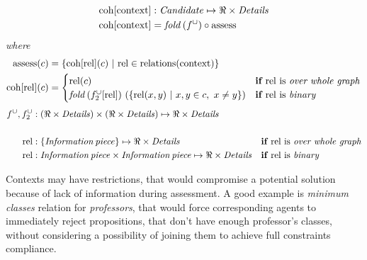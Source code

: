 \documentclass[ThesisDoc]{subfiles}
\begin{document}
\begin{align}
\begin{split}
  \mathrm{coh}[\mathrm{context}] &: \mathit{Candidate} \mapsto \Re \times \mathit{Details} \\
  \mathrm{coh}[\mathrm{context}] &= \mathit{fold}\,(f^\cup) \circ \mathrm{assess}
\end{split}
\end{align}
\emph{where}
\begin{align*}
    \mathrm{assess}(c) &=
      \lbrace \mathrm{coh}[\mathrm{rel}](c) ~|~ \mathrm{rel} \in \mathrm{relations}(\mathrm{context})
      \rbrace\\
    \mathrm{coh}[\mathrm{rel}](c) &= \begin{cases}
                       \mathrm{rel}(c) & \textbf{if } \mathrm{rel} \text{ is \emph{over whole graph}}
                       \\
                       \mathit{fold}\, (f^\cup_2[\mathrm{rel}]) ~
                                (\lbrace \mathrm{rel}(x,y) ~|~ x,y \in c, ~ x \not= y
                                 \rbrace)
                          & \textbf{if } \mathrm{rel} \text{ is \emph{binary}}
                     \end{cases}
\end{align*}
\begin{align*}
  f^\cup, f^\cup_2 &: (\Re \times \mathit{Details}) \times (\Re \times \mathit{Details})
                      \mapsto \Re \times \mathit{Details} & &
  \\ \\
  \mathrm{rel} &:\lbrace \mathit{Information\,piece} \rbrace
              \mapsto \Re \times \mathit{Details}
       & \textbf{if } & \mathrm{rel} \text{ is \emph{over whole graph}}
  \\
  \mathrm{rel} &:\mathit{Information\,piece} \times \mathit{Information\,piece}
              \mapsto \Re \times \mathit{Details}
       & \textbf{if } & \mathrm{rel} \text{ is \emph{binary}}
\end{align*}


\medskip
\noindent
Contexts may have restrictions, that would compromise a potential solution
because of lack of information during assessment. A good example is
\emph{minimum classes} relation for \emph{professors}, that would force
corresponding agents to immediately reject propositions, that don't have enough
professor's classes, without considering a possibility of joining them to achieve
full constraints compliance.
\end{document}
